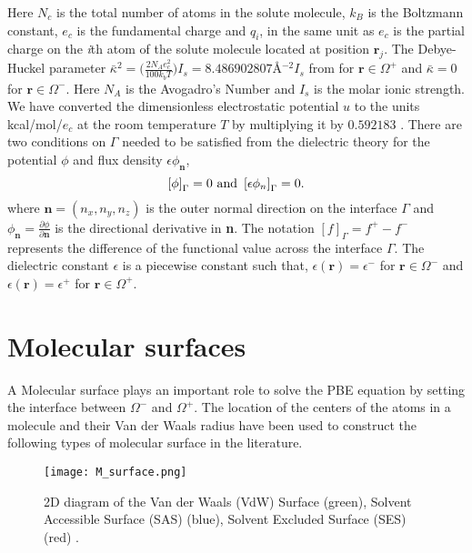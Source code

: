 Here $N_c$ is the total number of atoms in the solute molecule, $k_B$ is the Boltzmann constant, $e_c$ is the fundamental charge and $q_i$, in the same unit as $e_c$ is the partial charge on the \textit{i}th atom of the solute molecule located at position $\textbf{r}_j$. The Debye-Huckel parameter $\bar\kappa^2 =\Big(\frac{2N_A e_c^2}{100 k_b T}\Big)I_s =  8.486902807$\AA$^{-2} I_s$ from \cite{Holst:1993} for $\textbf{r} \in \Omega^+$ and $\bar\kappa=0$ for $\textbf{r} \in \Omega^-$. Here $N_A$ is  the Avogadro’s Number and $I_s$ is the molar ionic strength. We have converted the dimensionless electrostatic potential $u$ to the units kcal/mol/$e_c$ at the room temperature $T$ by multiplying it by $0.592183$ \cite{Holst:1993}. There are two conditions on $\Gamma$ needed to be satisfied from the dielectric theory for the potential $\phi$ and flux density $\epsilon \phi_\textbf{n} $, 
\begin{equation}
\left[\phi \right]_\Gamma = 0 \textnormal{ and } \left[\epsilon\phi_n\right]_\Gamma = 0. \label{ju_cond}
\end{equation}
where $\textbf{n}=(n_x,n_y,n_z)$ is the outer normal direction on the interface $\Gamma$ and $\phi_\textbf{n}= \frac{\partial \phi}{\partial\textbf{n}} $ is the directional derivative in \textbf{n}. The notation $[f]_\Gamma = f^+-f^-$ represents the difference of the functional value across the interface $\Gamma$. The dielectric constant $\epsilon$ is a piecewise constant such that, $\epsilon(\textbf{r})=\epsilon^-$ for $\textbf{r} \in \Omega^-$ and $\epsilon(\textbf{r})=\epsilon^+$ for $\textbf{r} \in \Omega^+$. 

\section{Molecular surfaces}
\label{sec:m_srface}
A Molecular surface plays an important role to solve the PBE equation by setting the interface between $\Omega^-$ and $\Omega^+$. The location of the centers of the atoms in a molecule and their Van der Waals radius have been used to construct the following types of molecular surface in the literature.  
\begin{figure}[!t]
	\begin{center}
		\texttt{[image: M\_surface.png]}
	\end{center}
	\caption{2D diagram of the Van der Waals (VdW) Surface (green), Solvent Accessible Surface
(SAS) (blue), Solvent Excluded Surface (SES) (red) \cite{Quan2018}.}
\label{fig:M_surface}
\end{figure}

